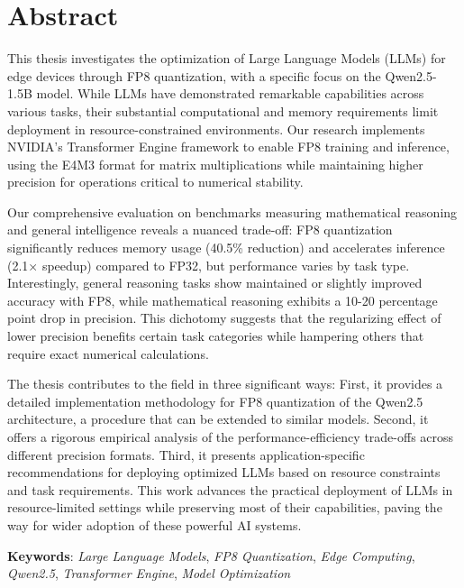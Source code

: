 \chapter*{Abstract}

This thesis investigates the optimization of Large Language Models (LLMs) for edge devices through FP8 quantization, with a specific focus on the Qwen2.5-1.5B model. While LLMs have demonstrated remarkable capabilities across various tasks, their substantial computational and memory requirements limit deployment in resource-constrained environments. Our research implements NVIDIA's Transformer Engine framework to enable FP8 training and inference, using the E4M3 format for matrix multiplications while maintaining higher precision for operations critical to numerical stability.

Our comprehensive evaluation on benchmarks measuring mathematical reasoning and general intelligence reveals a nuanced trade-off: FP8 quantization significantly reduces memory usage (40.5\% reduction) and accelerates inference (2.1× speedup) compared to FP32, but performance varies by task type. Interestingly, general reasoning tasks show maintained or slightly improved accuracy with FP8, while mathematical reasoning exhibits a 10-20 percentage point drop in precision. This dichotomy suggests that the regularizing effect of lower precision benefits certain task categories while hampering others that require exact numerical calculations.

The thesis contributes to the field in three significant ways: First, it provides a detailed implementation methodology for FP8 quantization of the Qwen2.5 architecture, a procedure that can be extended to similar models. Second, it offers a rigorous empirical analysis of the performance-efficiency trade-offs across different precision formats. Third, it presents application-specific recommendations for deploying optimized LLMs based on resource constraints and task requirements. This work advances the practical deployment of LLMs in resource-limited settings while preserving most of their capabilities, paving the way for wider adoption of these powerful AI systems.

\textbf{Keywords}: \textit{Large Language Models}, \textit{FP8 Quantization}, \textit{Edge Computing}, \textit{Qwen2.5}, \textit{Transformer Engine}, \textit{Model Optimization}